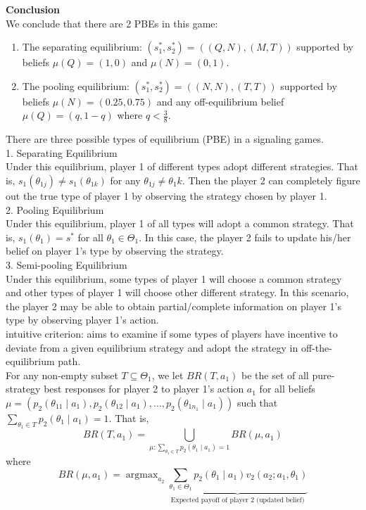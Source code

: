 \documentclass[twoside]{article}
\theoremstyle{definitionstyle}
\begin{document}
\vspace{0.5em}
\noindent\textbf{Conclusion} \\
We conclude that there are 2 PBEs in this game:
\begin{enumerate}
    \item The separating equilibrium: $(s_1^*, s_2^*) = ((Q, N), (M, T))$ supported by beliefs $\mu(Q)=(1,0)$ and $\mu(N)=(0,1)$.
    \item The pooling equilibrium: $(s_1^*, s_2^*) = ((N, N), (T, T))$ supported by beliefs $\mu(N)=(0.25,0.75)$ and any off-equilibrium belief $\mu(Q)=(q, 1-q)$ where $q < \frac{3}{8}$.
\end{enumerate}
There are three possible types of equilibrium (PBE) in a signaling games.\\
1. Separating Equilibrium\\
Under this equilibrium, player 1 of different types adopt different strategies. That is, $s_1(\theta_{1j})\neq s_1(\theta_{1k})$ for any $\theta_{1j}\neq\theta_1k$. Then the player 2 can completely figure out the true type of player 1 by observing the strategy chosen by player 1.\\
2. Pooling Equilibrium\\
Under this equilibrium, player 1 of all types will adopt a common strategy. That is, $s_1(\theta_1) = s^*$ for all $\theta_1\in \Theta_1$. In this case, the player 2 fails to update his/her belief on player 1's type by observing the strategy.\\
3. Semi-pooling Equilibrium\\
Under this equilibrium, some types of player 1 will choose a common strategy and other types of player 1 will choose other different strategy. In this scenario, the player 2 may be able to obtain partial/complete information on player 1's type by observing player 1's action.\\
\newline
intuitive criterion: aims to examine if some types of players have incentive to deviate from a given equilibrium strategy and adopt the strategy in off-the-equilibrium path.\\
\newline
For any non-empty subset $T \subseteq \Theta_1$, we let $BR(T, a_1)$ be the set of all pure-strategy best responses for player 2 to player 1’s action $a_1$ for all beliefs $\mu = (p_2(\theta_{11} \mid a_1), p_2(\theta_{12} \mid a_1), \dots, p_2(\theta_{1n_1} \mid a_1))$ such that $\sum_{\theta_1 \in T} p_2(\theta_1 \mid a_1) = 1$. That is,
$$BR(T, a_1) = \bigcup_{\mu: \sum_{\theta_1 \in T} p_2(\theta_1 \mid a_1)=1} BR(\mu, a_1)$$
where
$$BR(\mu, a_1) = \operatorname{argmax}_{a_2} \underbrace{\sum_{\theta_1 \in \Theta_1} p_2(\theta_1 \mid a_1) v_2(a_2; a_1, \theta_1)}_{\text{Expected payoff of player 2 (updated belief)}}$$
\end{document}
